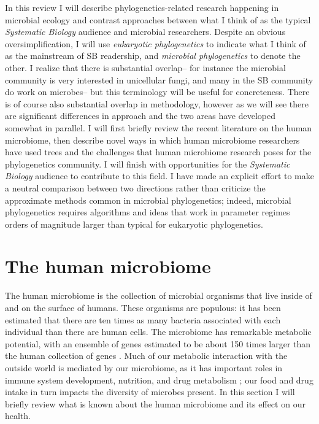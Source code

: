 \documentclass{amsart}
\begin{document}
In this review I will describe phylogenetics-related research happening in microbial ecology and contrast approaches between what I think of as the typical \emph{Systematic Biology} audience and microbial researchers.
Despite an obvious oversimplification, I will use \textit{eukaryotic phylogenetics} to indicate what I think of as the mainstream of SB readership, and \textit{microbial phylogenetics} to denote the other.
I realize that there is substantial overlap-- for instance the microbial community is very interested in unicellular fungi, and many in the SB community do work on microbes-- but this terminology will be useful for concreteness.
There is of course also substantial overlap in methodology, however as we will see there are significant differences in approach and the two areas have developed somewhat in parallel.
I will first briefly review the recent literature on the human microbiome, then describe novel ways in which human microbiome researchers have used trees and the challenges that human microbiome research poses for the phylogenetics community.
I will finish with opportunities for the \textit{Systematic Biology} audience to contribute to this field.
I have made an explicit effort to make a neutral comparison between two directions rather than criticize the approximate methods common in microbial phylogenetics; indeed, microbial phylogenetics requires algorithms and ideas that work in parameter regimes orders of magnitude larger than typical for eukaryotic phylogenetics.

\section{The human microbiome}
The human microbiome is the collection of microbial organisms that live inside of and on the surface of humans.
These organisms are populous: it has been estimated that there are ten times as many bacteria associated with each individual than there are human cells.
The microbiome has remarkable metabolic potential, with an ensemble of genes estimated to be about 150 times larger than the human collection of genes \citep{qin2010human}.
Much of our metabolic interaction with the outside world is mediated by our microbiome, as it has important roles in immune system development, nutrition, and drug metabolism \citep{kau2011human,maurice2013xenobiotics}; our food and drug intake in turn impacts the diversity of microbes present.
In this section I will briefly review what is known about the human microbiome and its effect on our health.
\end{document}

